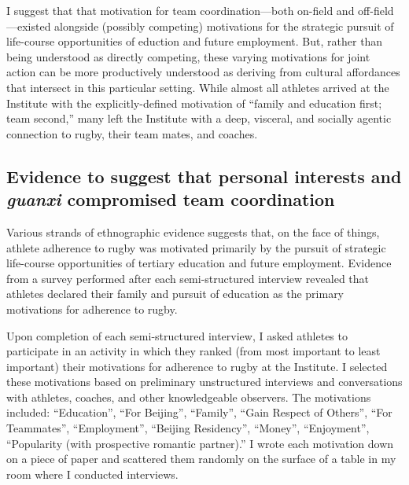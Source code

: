 \begin{CJK}{UTF8}{gbsn}
I suggest that that motivation for team coordination---both on-field and off-field---existed alongside (possibly competing) motivations for the strategic pursuit of life-course opportunities of eduction and future employment.  But, rather than being understood as directly competing, these varying motivations for joint action can be more productively understood as deriving from cultural affordances that intersect in this particular setting.  While almost all athletes arrived at the Institute with the explicitly-defined motivation of ``family and education first; team second,'' many left the Institute with a deep, visceral, and socially agentic connection to rugby, their team mates, and coaches.



\subsection{Evidence to suggest that personal interests and \textit{guanxi} compromised team coordination}

Various strands of ethnographic evidence suggests that, on the face of things, athlete adherence to rugby was motivated primarily by the pursuit of strategic life-course opportunities of tertiary education and future employment.  Evidence from a survey performed after each semi-structured interview revealed that athletes declared their family and pursuit of education as the primary motivations for adherence to rugby.

Upon completion of each semi-structured interview, I asked athletes to participate in an activity in which they ranked (from most important to least important) their motivations for adherence to rugby at the Institute.  I selected these motivations based on preliminary unstructured interviews and conversations with athletes, coaches, and other knowledgeable observers.  The motivations included: ``Education'', ``For Beijing'', ``Family'', ``Gain Respect of Others'', ``For Teammates'', ``Employment'', ``Beijing Residency'', ``Money'', ``Enjoyment'', ``Popularity (with prospective romantic partner).'' I wrote each motivation down on a piece of paper and scattered them randomly on the surface of a table in my room where I conducted interviews.


\end{CJK}
